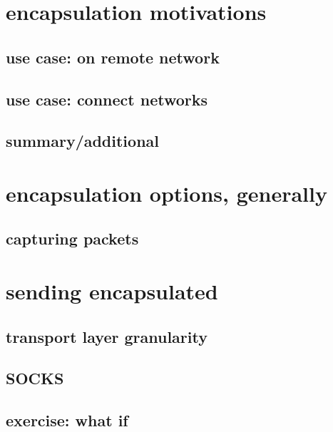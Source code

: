 
\section{encapsulation motivations}
\subsection{use case: on remote network}

\subsection{use case: connect networks}



\subsection{summary/additional}




\section{encapsulation options, generally}


\subsection{capturing packets}


\section{sending encapsulated}

\subsection{transport layer granularity}


\subsection{SOCKS}


\subsection{exercise: what if}


